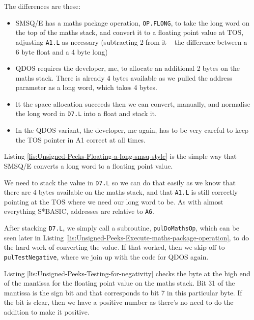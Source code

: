 The differences are these:
\begin{itemize}
\item SMSQ/E has a maths package operation, \texttt{OP.FLONG}, to take the
long word on the top of the maths stack, and convert it to a floating
point value at TOS, adjusting \texttt{A1.L} as necessary (subtracting
2 from it -- the difference between a 6 byte float and a 4 byte long)
\item QDOS requires the developer, me, to allocate an additional 2 bytes
on the maths stack. There is already 4 bytes available as we pulled
the address parameter as a long word, which takes 4 bytes.
\item It the space allocation succeeds then we can convert, manually, and
normalise the long word in \texttt{D7.L} into a float and stack it.
\item In the QDOS variant, the developer, me again, has to be very careful
to keep the TOS pointer in A1 correct at all times. 
\end{itemize}
Listing \ref{lis:Unsigned-Peeks-Floating-a-long-smsq-style} is the
simple way that SMSQ/E converts a long word to a floating point value.



We need to stack the value in \texttt{D7.L} so we can do that easily
as we know that there are 4 bytes available on the maths stack, and
that \texttt{A1.L} is still correctly pointing at the TOS where we
need our long word to be. As with almost everything S{*}BASIC, addresses
are relative to \texttt{A6}. 

After stacking \texttt{D7.L}, we simply call a subroutine, \texttt{pulDoMathsOp},
which can be seen later in Listing \ref{lis:Unsigned-Peeks-Execute-maths-package-operation},
to do the hard work of converting the value. If that worked, then
we skip off to \texttt{pulTestNegative}, where we join up with the
code for QDOS again.



Listing \ref{lis:Unsigned-Peeks-Testing-for-negativity} checks the
byte at the high end of the mantissa for the floating point value
on the maths stack. Bit 31 of the mantissa is the sign bit and that
corresponds to bit 7 in this particular byte. If the bit is clear,
then we have a positive number as there's no need to do the addition
to make it positive.

